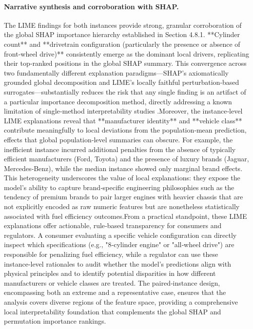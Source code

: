 \paragraph{Narrative synthesis and corroboration with SHAP.}
The LIME findings for both instances provide strong, granular corroboration of the global SHAP importance hierarchy established in Section 4.8.1. **Cylinder count** and **drivetrain configuration (particularly the presence or absence of front‑wheel drive)** consistently emerge as the dominant local drivers, replicating their top‑ranked positions in the global SHAP summary. This convergence across two fundamentally different explanation paradigms—SHAP’s axiomatically grounded global decomposition and LIME’s locally faithful perturbation‑based surrogates—substantially reduces the risk that any single finding is an artifact of a particular importance decomposition method, directly addressing a known limitation of single‑method interpretability studies \cite{mangalathu2020failure}.Moreover, the instance‑level LIME explanations reveal that **manufacturer identity** and **vehicle class** contribute meaningfully to local deviations from the population‑mean prediction, effects that global population‑level summaries can obscure. For example, the inefficient instance incurred additional penalties from the absence of typically efficient manufacturers (Ford, Toyota) and the presence of luxury brands (Jaguar, Mercedes‑Benz), while the median instance showed only marginal brand effects. This heterogeneity underscores the value of local explanations: they expose the model’s ability to capture brand‑specific engineering philosophies such as the tendency of premium brands to pair larger engines with heavier chassis that are not explicitly encoded as raw numeric features but are nonetheless statistically associated with fuel efficiency outcomes.From a practical standpoint, these LIME explanations offer actionable, rule‑based transparency for consumers and regulators. A consumer evaluating a specific vehicle configuration can directly inspect which specifications (e.g., "8‑cylinder engine" or "all‑wheel drive") are responsible for penalizing fuel efficiency, while a regulator can use these instance‑level rationales to audit whether the model’s predictions align with physical principles and to identify potential disparities in how different manufacturers or vehicle classes are treated. The paired‑instance design, encompassing both an extreme and a representative case, ensures that the analysis covers diverse regions of the feature space, providing a comprehensive local interpretability foundation that complements the global SHAP and permutation importance rankings.


